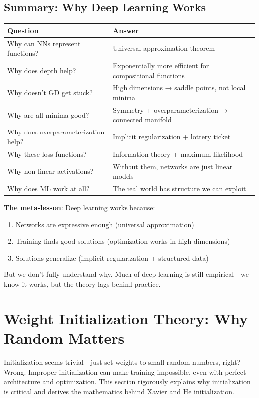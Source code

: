 \documentclass[11pt,oneside]{book}
\begin{document}
\subsection{Summary: Why Deep Learning Works}

\begin{table}[h]
\centering
\begin{tabular}{ll}
\toprule
\textbf{Question} & \textbf{Answer} \\
\midrule
Why can NNs represent functions? & Universal approximation theorem \\
Why does depth help? & Exponentially more efficient for compositional functions \\
Why doesn't GD get stuck? & High dimensions → saddle points, not local minima \\
Why are all minima good? & Symmetry + overparameterization → connected manifold \\
Why does overparameterization help? & Implicit regularization + lottery ticket \\
Why these loss functions? & Information theory + maximum likelihood \\
Why non-linear activations? & Without them, networks are just linear models \\
Why does ML work at all? & The real world has structure we can exploit \\
\bottomrule
\end{tabular}
\end{table}

\textbf{The meta-lesson}: Deep learning works because:
\begin{enumerate}
\item Networks are expressive enough (universal approximation)
\item Training finds good solutions (optimization works in high dimensions)
\item Solutions generalize (implicit regularization + structured data)
\end{enumerate}

But we don't fully understand why. Much of deep learning is still empirical - we know it works, but the theory lags behind practice.

\section{Weight Initialization Theory: Why Random Matters}

Initialization seems trivial - just set weights to small random numbers, right? Wrong. Improper initialization can make training impossible, even with perfect architecture and optimization. This section rigorously explains why initialization is critical and derives the mathematics behind Xavier and He initialization.
\end{document}
